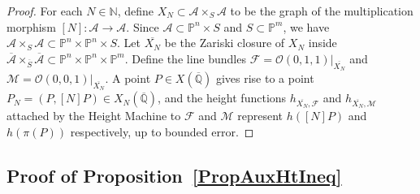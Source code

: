 \begin{proof}
  For each \(N \in \mathbb{N}\), define \(X_N \subset \mathcal{A} \times_S \mathcal{A}\)
  to be the graph of the multiplication morphism \([N] \colon \mathcal{A} \to \mathcal{A}\).
  Since \(\mathcal{A} \subset \mathbb{P}^n \times S\) and \(S \subset \mathbb{P}^m\),
  we have \(\mathcal{A} \times_S \mathcal{A} \subset \mathbb{P}^n \times \mathbb{P}^n \times S\).
  Let \(\overline{X_N}\) be the Zariski closure of \(X_N\) inside
  \(\overline{\mathcal{A}} \times_{\overline{S}} \overline{\mathcal{A}} \subset
  \mathbb{P}^n \times \mathbb{P}^n \times \mathbb{P}^m\).
  Define the line bundles
  \(\mathcal{F} = \mathcal{O}(0,1,1)|_{\overline{X_N}}\) and
  \(\mathcal{M} = \mathcal{O}(0,0,1)|_{\overline{X_N}}\).
  A point \(P \in X(\overline{\mathbb{Q}})\) gives rise to a point
  \(P_N = (P, [N]P) \in X_N(\overline{\mathbb{Q}})\), and the height functions
  \(h_{\overline{X_N},\mathcal{F}}\) and \(h_{\overline{X_N},\mathcal{M}}\)
  attached by the Height Machine to \(\mathcal{F}\) and \(\mathcal{M}\)
  represent \(h([N]P)\) and \(h(\pi(P))\) respectively, up to bounded error.
\end{proof}

\subsection{Proof of Proposition~\ref{PropAuxHtIneq}}

